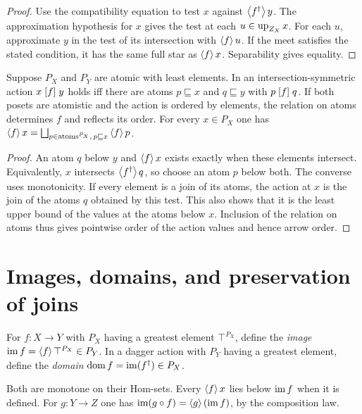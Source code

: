 \begin{proof}
Use the compatibility equation to test $x$ against
$\left\langle f^\dagger\right\rangle y$. The approximation hypothesis for $x$ gives
the test at each $u\in\operatorname{up}_{Z_X}x$. For each $u$, approximate $y$
in the test of its intersection with $\left\langle f\right\rangle u$. If the meet
satisfies the stated condition, it has the same full star as
$\left\langle f\right\rangle x$. Separability gives equality.
\end{proof}

\begin{prop}\label{prop-osa-atom-recovery}
Suppose $P_X$ and $P_Y$ are atomic with least elements.
In an intersection-symmetric action $x\mathrel{\left[f\right]}y$ holds iff
there are atoms $p\sqsubseteq x$ and $q\sqsubseteq y$ with
$p\mathrel{\left[f\right]}q$.
If both posets are atomistic and the action is ordered by elements,
the relation on atoms determines $f$ and reflects its order.
For every $x\in P_X$ one has
$\supfun{f}x=\bigsqcup_{p\in\atoms^{P_X},\,p\sqsubseteq x}\supfun{f}p$.
\end{prop}

\begin{proof}
An atom $q$ below $y$ and $\left\langle f\right\rangle x$ exists exactly when these
elements intersect. Equivalently, $x$ intersects $\left\langle f^\dagger\right\rangle q$,
so choose an atom $p$ below both. The converse uses monotonicity.
If every element is a join of its atoms, the action at $x$ is
the join of the atoms $q$ obtained by this test. This also shows
that it is the least upper bound of the values at the atoms below $x$.
Inclusion of the relation on atoms thus gives pointwise order of
the action values and hence arrow order.
\end{proof}

\section{Images, domains, and preservation of joins}
\label{sec-osa-image}

\begin{defn}\label{def-osa-image}
For $f:X\to Y$ with $P_X$ having a greatest element $\top^{P_X}$,
define the \emph{image} $\operatorname{im} f=\left\langle f\right\rangle\top^{P_X}\in P_Y$.
In a dagger action with $P_Y$ having a greatest element, define the
\emph{domain} $\operatorname{dom} f=\operatorname{im}(f^\dagger)\in P_X$.
\end{defn}

Both are monotone on their Hom-sets. Every $\left\langle f\right\rangle x$ lies below
$\operatorname{im} f$ when it is defined. For $g:Y\to Z$ one has
$\operatorname{im}(g\circ f)=\left\langle g\right\rangle(\operatorname{im} f)$, by the composition law.

